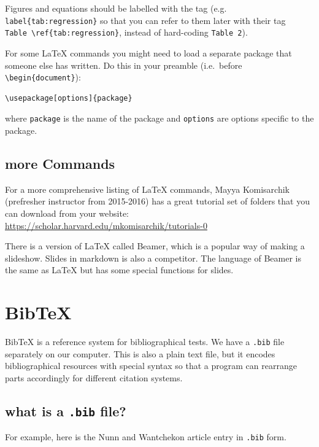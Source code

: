 \documentclass[]{book}
\theoremstyle{definition}
\theoremstyle{definition}
\theoremstyle{definition}
\theoremstyle{remark}
\begin{document}
Figures and equations should be labelled with the tag (e.g.
\texttt{label\{tab:regression\}} so that you can refer to them later
with their tag \texttt{Table\ \textbackslash{}ref\{tab:regression\}},
instead of hard-coding \texttt{Table\ 2}).

For some LaTeX commands you might need to load a separate package that
someone else has written. Do this in your preamble (i.e.~before
\texttt{\textbackslash{}begin\{document\}}):

\begin{verbatim}
\usepackage[options]{package}
\end{verbatim}

where \texttt{package} is the name of the package and \texttt{options}
are options specific to the package.

\subsection{more Commands}\label{more-commands}

For a more comprehensive listing of LaTeX commands, Mayya Komisarchik
(prefresher instructor from 2015-2016) has a great tutorial set of
folders that you can download from your website:
\url{https://scholar.harvard.edu/mkomisarchik/tutorials-0}

There is a version of LaTeX called Beamer, which is a popular way of
making a slideshow. Slides in markdown is also a competitor. The
language of Beamer is the same as LaTeX but has some special functions
for slides.

\section{BibTeX}\label{bibtex}

BibTeX is a reference system for bibliographical tests. We have a
\texttt{.bib} file separately on our computer. This is also a plain text
file, but it encodes bibliographical resources with special syntax so
that a program can rearrange parts accordingly for different citation
systems.

\subsection{\texorpdfstring{what is a \texttt{.bib}
file?}{what is a .bib file?}}\label{what-is-a-.bib-file}

For example, here is the Nunn and Wantchekon article entry in
\texttt{.bib} form.
\end{document}
